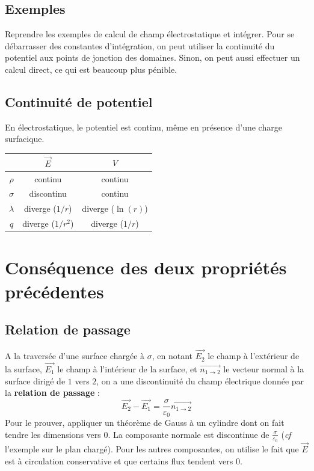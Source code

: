 \documentclass[french]{book}
\theoremstyle{plain}
\theoremstyle{definition}
\theoremstyle{remark}
\begin{document}
\subsection{Exemples}
Reprendre les exemples de calcul de champ électrostatique et intégrer. Pour se débarrasser des constantes d'intégration, on peut utiliser la continuité du potentiel aux points de jonction des domaines. Sinon, on peut aussi effectuer un calcul direct, ce qui est beaucoup plus pénible.
\subsection{Continuité de potentiel}
En électrostatique, le potentiel est continu, même en présence d'une charge surfacique.
\begin{center}
	\begin{tabular}{|c|c|c|}
		\hline
		&$\overrightarrow{E}$&$V$ \\
		\hline
		$\rho$&continu&continu \\
		\hline
		$\sigma$&discontinu&continu \\
		\hline
		$\lambda$&diverge ($1/r$)&diverge ($\ln(r)$) \\
		\hline
		$q$&diverge ($1/r^2$)&diverge ($1/r$)\\
		\hline
	\end{tabular}
\end{center}
\section{Conséquence des deux propriétés précédentes}
\subsection{Relation de passage}
A la traversée d'une surface chargée à $\sigma$, en notant $\overrightarrow{E_2}$ le champ à l'extérieur de la surface, $\overrightarrow{E_1}$ le champ à l'intérieur de la surface, et $\overrightarrow{n_{1\to 2}}$ le vecteur normal à la surface dirigé de $1$ vers $2$, on a une discontinuité du champ électrique donnée par la \textbf{relation de passage} : $$\overrightarrow{E_2}-\overrightarrow{E_1}=\frac{\sigma}{\varepsilon_0}\overrightarrow{n_{1\to 2}}$$ Pour le prouver, appliquer un théorème de Gauss à un cylindre dont on fait tendre les dimensions vers $0$. La composante normale est discontinue de $\displaystyle\frac{\sigma}{\varepsilon_0}$ (\textit{cf} l'exemple sur le plan chargé). Pour les autres composantes, on utilise le fait que $\overrightarrow{E}$ est à circulation conservative et que certains flux tendent vers $0$.
\end{document}
